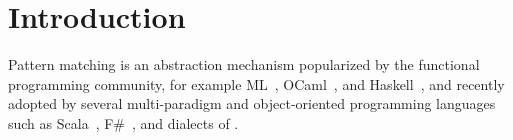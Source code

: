 \section{Introduction} %
\label{sec:intro}


Pattern matching is an abstraction mechanism popularized by the functional
programming community, for example ML~\cite{ML78},
OCaml~\cite{OPM01}, and Haskell~\cite{haskell90},
and recently adopted by several multi-paradigm and object-oriented programming 
languages such as Scala~\cite{Scala2nd}, F\#~\cite{Syme07}, 
 and dialects of 
\Cpp{}\cite{Prop96,App}. %

